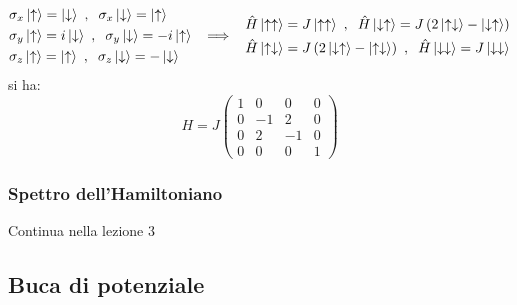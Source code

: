 \documentclass[10pt, a4paper]{scrartcl}
\numberwithin{equation}{subsection}
\theoremstyle{style2}
\theoremstyle{style1}
\newenvironment{boxenv}[1][]{
    \begin{eqbox}[#1]
    }{
   \end{eqbox}
}
\begin{document}
\[
\begin{split}
	&\sigma _x \ket{\uparrow} = \ket{\downarrow} \ , \hspace{.2cm} \sigma _x \ket{\downarrow} = \ket{\uparrow} \\
	&\sigma _y \ket{\uparrow} = i\ket{\downarrow} \ , \hspace{.2cm} \sigma _y \ket{\downarrow} = -i \ket{\uparrow} \\
	&\sigma _z \ket{\uparrow} = \ket{\uparrow} \ , \hspace{.2cm} \sigma _z \ket{\downarrow} = -\ket{\downarrow}
	\end{split} \hspace{.2cm}\implies\hspace{.2cm} \begin{split}
	&\hat{ H} \ket{\uparrow \uparrow} = J \ket{\uparrow \uparrow}\ , \hspace{.2cm}\hat{H} \ket{\downarrow \uparrow} = J \left(2 \ket{\uparrow\downarrow} - \ket{\downarrow \uparrow} \right) \\
	&\hat{ H} \ket{\uparrow \downarrow} = J \left(2 \ket{\downarrow \uparrow} - \ket{\uparrow \downarrow} \right) \ , \hspace{.2cm}  \hat{H} \ket{\downarrow \downarrow} = J \ket{\downarrow \downarrow} 
\end{split}
\] 
si ha:
\begin{equation}
	H = J \begin{pmatrix} 1& 0&0&0 \\ 0 & -1 & 2 & 0 \\ 0&2 & -1 & 0 \\ 0&0&0&1 \end{pmatrix} 
\end{equation}
\subsubsection{Spettro dell'Hamiltoniano}
\begin{boxenv}[]
\centering Continua nella lezione $3$
\end{boxenv}
\subsection{Buca di potenziale}
\end{document}
